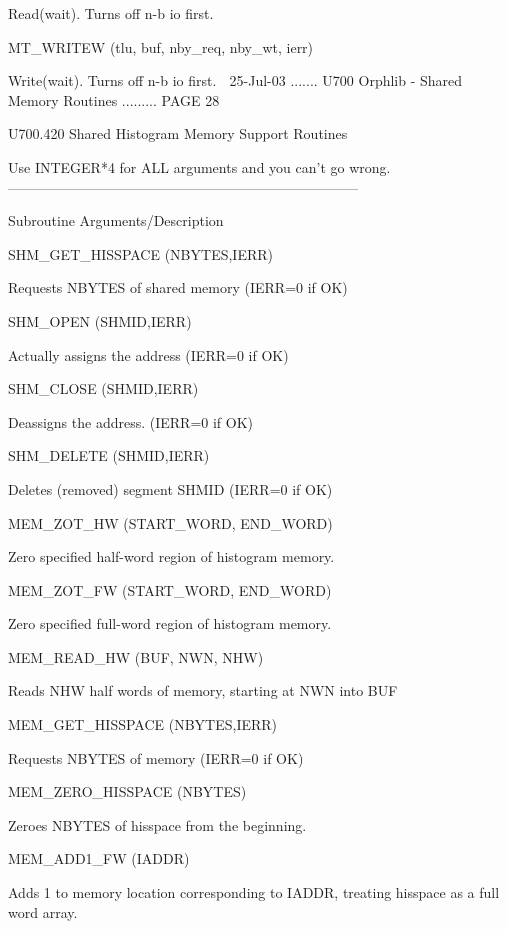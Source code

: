                        Read(wait). Turns off n-b io first.
 
   MT_WRITEW          (tlu, buf, nby_req, nby_wt, ierr)
 
                       Write(wait).  Turns off n-b io first.
    
   25-Jul-03 ....... U700  Orphlib - Shared Memory Routines ......... PAGE  28
 
 
   U700.420  Shared Histogram Memory Support Routines
 
   Use INTEGER*4 for ALL arguments and you can't go wrong.
   ---------------------------------------------------------------------------
 
   Subroutine          Arguments/Description
 
   SHM_GET_HISSPACE   (NBYTES,IERR)
 
                      Requests NBYTES of shared memory (IERR=0 if OK)
 
   SHM_OPEN          (SHMID,IERR)
 
                      Actually assigns the address     (IERR=0 if OK)
 
   SHM_CLOSE         (SHMID,IERR)
 
                      Deassigns the address.           (IERR=0 if OK)
 
   SHM_DELETE        (SHMID,IERR)
 
                      Deletes (removed) segment SHMID  (IERR=0 if OK)
 
   MEM_ZOT_HW        (START_WORD, END_WORD)
 
                      Zero specified half-word region of histogram memory.
 
   MEM_ZOT_FW        (START_WORD, END_WORD)
 
                      Zero specified full-word region of histogram memory.
 
   MEM_READ_HW       (BUF, NWN, NHW)
 
                      Reads NHW half words of memory, starting at NWN into BUF
 
   MEM_GET_HISSPACE  (NBYTES,IERR)
 
                      Requests NBYTES of memory        (IERR=0 if OK)
 
   MEM_ZERO_HISSPACE (NBYTES)
 
                      Zeroes NBYTES of hisspace from the beginning.
 
   MEM_ADD1_FW       (IADDR)
 
                      Adds 1 to memory location corresponding to IADDR,
                      treating hisspace as a full word array.
 
